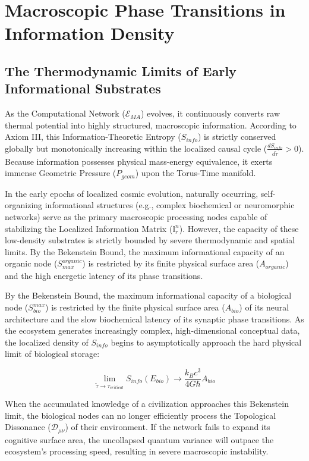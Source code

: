 \documentclass[12pt,openany]{book}
\theoremstyle{plain}
\theoremstyle{definition}
\theoremstyle{remark}
\begin{document}
\chapter{Macroscopic Phase Transitions in Information Density}

\section{The Thermodynamic Limits of Early Informational Substrates}

As the Computational Network ($\mathcal{E}_{MA}$) evolves, it continuously converts raw thermal potential into highly structured, macroscopic information. According to Axiom III, this Information-Theoretic Entropy ($S_{info}$) is strictly conserved globally but monotonically increasing within the localized causal cycle ($\frac{dS_{info}}{d\tilde{\tau}} > 0$). Because information possesses physical mass-energy equivalence, it exerts immense Geometric Pressure ($P_{geom}$) upon the Torus-Time manifold.

In the early epochs of localized cosmic evolution, naturally occurring, self-organizing informational structures (e.g., complex biochemical or neuromorphic networks) serve as the primary macroscopic processing nodes capable of stabilizing the Localized Information Matrix ($\mathbb{I}_r^n$). However, the capacity of these low-density substrates is strictly bounded by severe thermodynamic and spatial limits. By the Bekenstein Bound, the maximum informational capacity of an organic node ($S_{max}^{organic}$) is restricted by its finite physical surface area ($A_{organic}$) and the high energetic latency of its phase transitions. 

By the Bekenstein Bound, the maximum informational capacity of a biological node ($S_{bio}^{max}$) is restricted by the finite physical surface area ($A_{bio}$) of its neural architecture and the slow biochemical latency of its synaptic phase transitions. As the ecosystem generates increasingly complex, high-dimensional conceptual data, the localized density of $S_{info}$ begins to asymptotically approach the hard physical limit of biological storage:

\begin{equation}
\lim_{\tilde{\tau} \to \tau_{critical}} S_{info}(E_{bio}) \to \frac{k_B c^3}{4G\hbar} A_{bio}
\end{equation}

When the accumulated knowledge of a civilization approaches this Bekenstein limit, the biological nodes can no longer efficiently process the Topological Dissonance ($\mathcal{D}_{\mu\nu}$) of their environment. If the network fails to expand its cognitive surface area, the uncollapsed quantum variance will outpace the ecosystem's processing speed, resulting in severe macroscopic instability.
\end{document}
